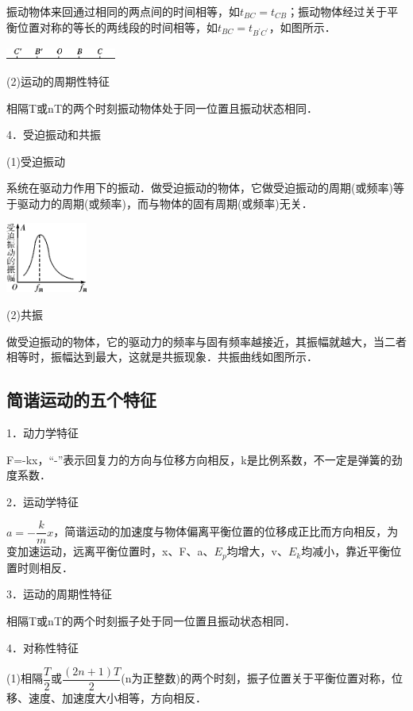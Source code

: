 振动物体来回通过相同的两点间的时间相等，如$t_{BC}=t_{CB}$；振动物体经过关于平衡位置对称的等长的两线段的时间相等，如$t_{BC}=t_{B^\prime C^\prime}$，如图所示．

\begin{center}\includegraphics[width=1.42431in,height=0.14167in]{media/image512.png}\end{center}

(2)运动的周期性特征

相隔T或nT的两个时刻振动物体处于同一位置且振动状态相同．

4．受迫振动和共振

(1)受迫振动

系统在驱动力作用下的振动．做受迫振动的物体，它做受迫振动的周期(或频率)等于驱动力的周期(或频率)，而与物体的固有周期(或频率)无关．

\begin{center}\includegraphics[width=1.04722in,height=0.91528in]{media/image513.png}\end{center}

(2)共振

做受迫振动的物体，它的驱动力的频率与固有频率越接近，其振幅就越大，当二者相等时，振幅达到最大，这就是共振现象．共振曲线如图所示．

\newpage
\subsection{简谐运动的五个特征}

1．动力学特征

F=-kx，``-''表示回复力的方向与位移方向相反，k是比例系数，不一定是弹簧的劲度系数．

2．运动学特征

$a=-\dfrac{k}{m}x$，简谐运动的加速度与物体偏离平衡位置的位移成正比而方向相反，为变加速运动，远离平衡位置时，x、F、a、$E_p$均增大，v、$E_k$均减小，靠近平衡位置时则相反．

3．运动的周期性特征

相隔T或nT的两个时刻振子处于同一位置且振动状态相同．

4．对称性特征

(1)相隔$\dfrac{T}{2}$或$\dfrac{(2n+1)T}{2}$(n为正整数)的两个时刻，振子位置关于平衡位置对称，位移、速度、加速度大小相等，方向相反．

